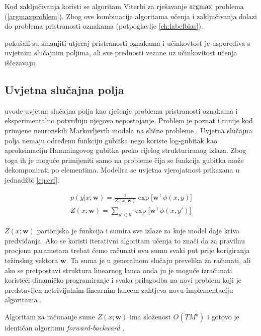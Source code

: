 Kod zaključivanja koristi se algoritam Viterbi za rješavanje $\operatorname*{argmax}$ problema
(\ref{argmaxproblem}). Zbog ove kombinacije algoritama učenja i zaključivanja
dolazi do problema pristranosti oznakama (potpoglavlje \ref{ch:labelbias}).

\cite{cohen05ijcai} pokušali su smanjiti utjecaj pristranosti oznakama i
učinkovtost je usporediva s uvjetnim slučajnim poljima, ali sve prednosti vezane
uz učinkovitost učenja iščezavaju.


\subsection{Uvjetna slučajna polja}

\citet*{lafferty2001conditional} uvode uvjetna slučajna polja kao rješenje
problema pristranosti oznakama i eksperimentalno potvrđuju njegovo nepostojanje.
Problem je poznat i ranije kod primjene neuronskih Markovljevih modela na slične
probleme \citep{leon1991approche}. Uvjetna slučajna polja nemaju određenu
funkciju gubitka nego koriste log-gubitak kao aproksimaciju Hammingovog gubitka
preko cijelog strukturiranog izlaza. Zbog toga ih je moguće primijeniti samo na
probleme čija se funkcija gubitka može dekomponirati po elementima. Modelira se
uvjetna vjerojatnost prikazana u jednadžbi \ref{eq:crf}.

\begin{equation}\label{eq:crf}
\begin{aligned}
  p(y | x; \mathbf{w}) = \frac{1}{Z(x; \mathbf{w})} \exp \big[ \mathbf{w}^\top \phi(x, y)\big] \\
  Z(x; \mathbf{w}) = \sum_{y' \in \mathcal{Y}} \exp \big[ \mathbf{w}^\top \phi(x, y')\big]
\end{aligned}
\end{equation}

$Z(x; \mathbf{w})$ particijska je funkcija i sumira sve izlaze za koje model
daje kriva predviđanja. Ako se koristi iterativni algoritam učenja to znači da
za pravilnu procjenu parametara trebat ćemo računati ovu sumu svaki put prije
korigiranja težinskog vektora $\mathbf{w}$. Ta suma je u generalnom slučaju
prevelika za računati, ali ako se pretpostavi struktura linearnog lanca onda ju
je moguće izračunati koristeći dinamičko programiranje i svaka prilagodba na
novi problem koji je predstavljen netrivijalnim linearnim lancem zahtjeva novu
implementaciju algoritama \citep{lafferty2001conditional, sha2003shallow}.

Algoritam za računanje sume $Z(x; \mathbf{w})$ ima složenost $O(T M ^ k)$ i
gotovo je identičan algoritmu \textit{forward-backward}
\citep{baum1966statistical}.

